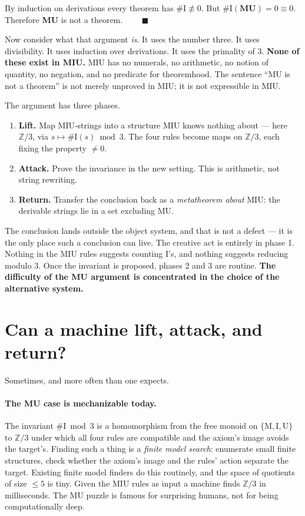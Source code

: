 \documentclass[11pt,a4paper]{article}
\begin{document}
By induction on derivations every theorem has $\#\mathrm{I} \not\equiv 0$. But
$\#\mathrm{I}(\textbf{MU}) = 0 \equiv 0$. Therefore \textbf{MU} is not a
theorem. $\qquad\blacksquare$

Now consider what that argument \emph{is}. It uses the number three. It uses
divisibility. It uses induction over derivations. It uses the primality of
$3$. \textbf{None of these exist in MIU.} MIU has no numerals, no arithmetic,
no notion of quantity, no negation, and no predicate for theoremhood. The
sentence ``MU is not a theorem'' is not merely unproved in MIU; it is not
expressible in MIU.

The argument has three phases.

\begin{enumerate}
\item \textbf{Lift.} Map MIU-strings into a structure MIU knows nothing about
--- here $\mathbb{Z}/3$, via $s \mapsto \#\mathrm{I}(s) \bmod 3$. The four
rules become maps on $\mathbb{Z}/3$, each fixing the property $\neq 0$.
\item \textbf{Attack.} Prove the invariance in the new setting. This is
arithmetic, not string rewriting.
\item \textbf{Return.} Transfer the conclusion back as a \emph{metatheorem
about} MIU: the derivable strings lie in a set excluding MU.
\end{enumerate}

The conclusion lands outside the object system, and that is not a defect --- it
is the only place such a conclusion can live. The creative act is entirely in
phase 1. Nothing in the MIU rules suggests counting I's, and nothing suggests
reducing modulo $3$. Once the invariant is proposed, phases 2 and 3 are
routine. \textbf{The difficulty of the MU argument is concentrated in the
choice of the alternative system.}

\section{Can a machine lift, attack, and return?}

Sometimes, and more often than one expects.

\paragraph{The MU case is mechanizable today.} The invariant
$\#\mathrm{I} \bmod 3$ is a homomorphism from the free monoid on
$\{\mathrm{M},\mathrm{I},\mathrm{U}\}$ to $\mathbb{Z}/3$ under which all four
rules are compatible and the axiom's image avoids the target's. Finding such a
thing is a \emph{finite model search}: enumerate small finite structures, check
whether the axiom's image and the rules' action separate the target. Existing
finite model finders do this routinely, and the space of quotients of size
$\le 5$ is tiny. Given the MIU rules as input a machine finds $\mathbb{Z}/3$ in
milliseconds. The MU puzzle is famous for surprising humans, not for being
computationally deep.
\end{document}
